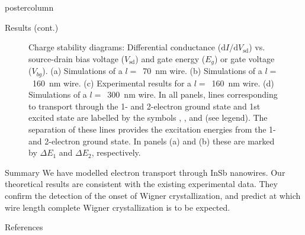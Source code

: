 \documentclass[final,hyperref={pdfpagelabels=true},notheorems]{beamer}
\newlength{\columnheight}
\begin{document}
\begin{frame}
\begin{columns}
    \begin{column}{.32\textwidth}
      \begin{beamercolorbox}[center,wd=\textwidth]{postercolumn}
        \begin{minipage}[T]{.95\textwidth} %
          \parbox[t][\columnheight]{\textwidth}{ %
            \begin{block}{Results (cont.)\phantom{Gg}}
              \begin{figure}
                \caption{Charge stability diagrams: Differential conductance ($\mathrm dI/\mathrm dV_\text{sd}$) vs. source-drain bias voltage ($V_\text{sd}$) and gate energy ($E_g$) or gate voltage ($V_{bg}$). \linebreak
                (a) Simulations of a $l=$~70~nm wire. (b) Simulations of a $l=$~160~nm wire. (c) Experimental results for a  $l=$~160~nm wire. (d) Simulations of a $l=$~300~nm wire. In all panels, lines corresponding to transport through the 1- and 2-electron ground state and 1st excited state are labelled by the symbols , ,  and  (see legend). The separation of these lines provides the excitation energies from the 1- and 2-electron ground state. In panels (a) and (b) these are marked by $\Delta E_1$ and $\Delta E_2$, respectively.}
                \label{fig:cond}
              \end{figure}
            \end{block}
            \vfill
            \begin{exampleblock}{Summary\phantom{Gg}}
              We have modelled electron transport through InSb nanowires. Our theoretical results are consistent with the existing experimental data. They confirm the detection of the onset of Wigner crystallization, and predict at which wire length complete Wigner crystallization is to be expected.
            \end{exampleblock}
            \vfill
            \begin{block}{References\phantom{Gg}}

\end{block}}
\end{minipage}
\end{beamercolorbox}
\end{column}
\end{columns}
\end{frame}
\end{document}
